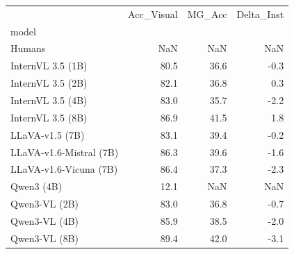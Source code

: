 \begin{tabular}{lrrr}
\toprule
 & Acc_Visual & MG_Acc & Delta_Inst \\
model &  &  &  \\
\midrule
Humans & NaN & NaN & NaN \\
InternVL 3.5 (1B) & 80.5 & 36.6 & -0.3 \\
InternVL 3.5 (2B) & 82.1 & 36.8 & 0.3 \\
InternVL 3.5 (4B) & 83.0 & 35.7 & -2.2 \\
InternVL 3.5 (8B) & 86.9 & 41.5 & 1.8 \\
LLaVA-v1.5 (7B) & 83.1 & 39.4 & -0.2 \\
LLaVA-v1.6-Mistral (7B) & 86.3 & 39.6 & -1.6 \\
LLaVA-v1.6-Vicuna (7B) & 86.4 & 37.3 & -2.3 \\
Qwen3 (4B) & 12.1 & NaN & NaN \\
Qwen3-VL (2B) & 83.0 & 36.8 & -0.7 \\
Qwen3-VL (4B) & 85.9 & 38.5 & -2.0 \\
Qwen3-VL (8B) & 89.4 & 42.0 & -3.1 \\
\bottomrule
\end{tabular}
